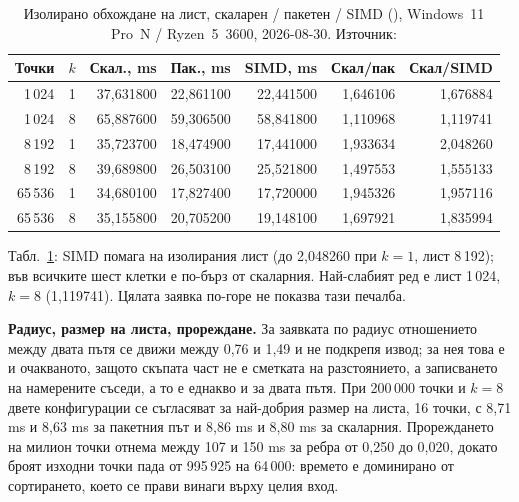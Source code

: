 \begin{table}[H]
\centering
\small
\caption{Изолирано обхождане на лист, скаларен / пакетен / SIMD (),
Windows~11 Pro~N / Ryzen~5~3600, 2026-08-30.
Източник: }
\label{tab:leafscan-simd}
\begin{tabular}{@{}rrrrrrr@{}}
\toprule
\textbf{Точки} & \textbf{$k$} & \textbf{Скал., ms} & \textbf{Пак., ms} & \textbf{SIMD, ms} & \textbf{Скал/пак} & \textbf{Скал/SIMD} \\
\midrule
1\,024  & 1 &  37{,}631800 & 22{,}861100 & 22{,}441500 & 1{,}646106 & 1{,}676884 \\
1\,024  & 8 &  65{,}887600 & 59{,}306500 & 58{,}841800 & 1{,}110968 & 1{,}119741 \\
8\,192  & 1 &  35{,}723700 & 18{,}474900 & 17{,}441000 & 1{,}933634 & 2{,}048260 \\
8\,192  & 8 &  39{,}689800 & 26{,}503100 & 25{,}521800 & 1{,}497553 & 1{,}555133 \\
65\,536 & 1 &  34{,}680100 & 17{,}827400 & 17{,}720000 & 1{,}945326 & 1{,}957116 \\
65\,536 & 8 &  35{,}155800 & 20{,}705200 & 19{,}148100 & 1{,}697921 & 1{,}835994 \\
\bottomrule
\end{tabular}
\end{table}

Табл.~\ref{tab:leafscan-simd}: SIMD помага на изолирания лист (до 2{,}048260 при $k{=}1$,
лист 8\,192); във всичките шест клетки е по-бърз от скаларния. Най-слабият ред е лист 1\,024,
$k{=}8$ (1{,}119741). Цялата заявка по-горе не показва тази печалба.

\textbf{Радиус, размер на листа, прореждане.} За заявката по радиус отношението между двата
пътя се движи между 0,76 и 1,49 и не подкрепя извод; за нея това е и очакваното, защото скъпата
част не е сметката на разстоянието, а записването на намерените съседи, а то е еднакво и за
двата пътя. При 200\,000 точки и $k = 8$ двете конфигурации се съгласяват за най-добрия размер
на листа, 16 точки, с 8,71 ms и 8,63 ms за пакетния път и 8,86 ms и 8,80 ms за скаларния.
Прореждането на милион точки отнема между 107 и 150 ms за ребра от 0,250 до 0,020, докато броят
изходни точки пада от 995\,925 на 64\,000: времето е доминирано от сортирането, което се прави
винаги върху целия вход.

